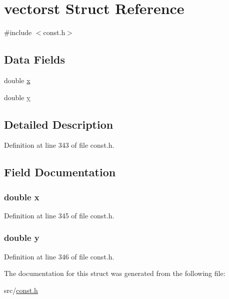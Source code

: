 \hypertarget{structvectorst}{}\section{vectorst Struct Reference}
\label{structvectorst}


{\ttfamily \#include $<$const.\+h$>$}

\subsection*{Data Fields}
\begin{DoxyCompactItemize}
\item 
double \hyperlink{structvectorst_af88b946fb90d5f08b5fb740c70e98c10}{x}
\item 
double \hyperlink{structvectorst_ab927965981178aa1fba979a37168db2a}{y}
\end{DoxyCompactItemize}


\subsection{Detailed Description}


Definition at line 343 of file const.\+h.



\subsection{Field Documentation}
\hypertarget{structvectorst_af88b946fb90d5f08b5fb740c70e98c10}{}
\subsubsection[{x}]{\setlength{\rightskip}{0pt plus 5cm}double x}\label{structvectorst_af88b946fb90d5f08b5fb740c70e98c10}


Definition at line 345 of file const.\+h.

\hypertarget{structvectorst_ab927965981178aa1fba979a37168db2a}{}
\subsubsection[{y}]{\setlength{\rightskip}{0pt plus 5cm}double y}\label{structvectorst_ab927965981178aa1fba979a37168db2a}


Definition at line 346 of file const.\+h.



The documentation for this struct was generated from the following file\+:\begin{DoxyCompactItemize}
\item 
src/\hyperlink{const_8h}{const.\+h}\end{DoxyCompactItemize}
